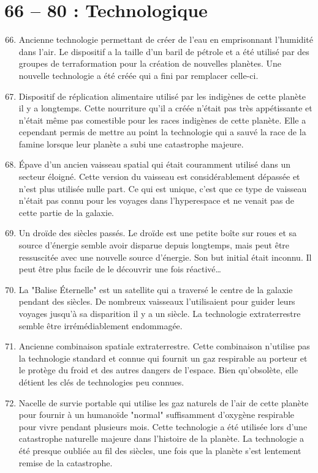 \documentclass{article}
\begin{document}
\section*{66 -- 80 : Technologique}
\begin{enumerate}
	\setcounter{enumi}{65}
	\item Ancienne technologie permettant de créer de l'eau en emprisonnant l'humidité dans l'air. Le dispositif a la taille d'un baril de pétrole et a été utilisé par des groupes de terraformation pour la création de nouvelles planètes. Une nouvelle technologie a été créée qui a fini par remplacer celle-ci.
	\item Dispositif de réplication alimentaire utilisé par les indigènes de cette planète il y a longtemps. Cette nourriture qu'il a créée n'était pas très appétissante et n'était même pas comestible pour les races indigènes de cette planète. Elle a cependant permis de mettre au point la technologie qui a sauvé la race de la famine lorsque leur planète a subi une catastrophe majeure.
	\item Épave d'un ancien vaisseau spatial qui était couramment utilisé dans un secteur éloigné. Cette version du vaisseau est considérablement dépassée et n'est plus utilisée nulle part. Ce qui est unique, c'est que ce type de vaisseau n'était pas connu pour les voyages dans l'hyperespace et ne venait pas de cette partie de la galaxie.
	\item Un droïde des siècles passés. Le droïde est une petite boîte sur roues et sa source d'énergie semble avoir disparue depuis longtemps, mais peut être ressuscitée avec une nouvelle source d'énergie. Son but initial était inconnu. Il peut être plus facile de le découvrir une fois réactivé… 
	\item La "Balise Éternelle" est un satellite qui a traversé le centre de la galaxie pendant des siècles. De nombreux vaisseaux l'utilisaient pour guider leurs voyages jusqu'à sa disparition il y a un siècle. La technologie extraterrestre semble être irrémédiablement endommagée.
	\item Ancienne combinaison spatiale extraterrestre. Cette combinaison n'utilise pas la technologie standard et connue qui fournit un gaz respirable au porteur et le protège du froid et des autres dangers de l'espace. Bien qu'obsolète, elle détient les clés de technologies peu connues.
	\item Nacelle de survie portable qui utilise les gaz naturels de l'air de cette planète pour fournir à un humanoïde "normal" suffisamment d'oxygène respirable pour vivre pendant plusieurs mois. Cette technologie a été utilisée lors d'une catastrophe naturelle majeure dans l'histoire de la planète. La technologie a été presque oubliée au fil des siècles, une fois que la planète s'est lentement remise de la catastrophe.

\end{enumerate}
\end{document}

